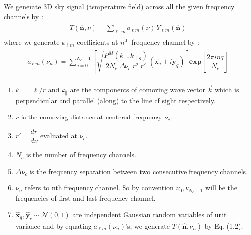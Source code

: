 \documentclass[a4paper,11pt,oneside,english,openany]{sphinxmanual}
\begin{document}
\sphinxAtStartPar
We generate 3D sky signal (temperature field) across all the given frequency channels by :
\begin{equation*}
\begin{split}\begin{align}
\boxed{T(\hat{\mathbf{n}}, \nu) = \sum_{\ell, m} a_{\ell m}(\nu) \, Y_{\ell m}(\hat{\mathbf{n}})}
\end{align}\end{split}
\end{equation*}
\sphinxAtStartPar
where we generate \(a_{\ell m}\) coefficients at \(n^{\text{th}}\) frequency channel by :
\begin{equation*}
\begin{split}\begin{align}
a_{\ell m}(\nu_n) = \sum_{q=0}^{N_c- 1} \left[
\sqrt{\dfrac{P^M(k_\perp, k_{\parallel q})}{2N_c\;\Delta{\nu_c }\;r^2\;r'}}
\left({\hat{\mathbf{x}}_q + i \hat{\mathbf{y}}_q} \right)
\right] {\textbf{exp}}\left[{\dfrac{2\pi i n q}{N_c}}\right]
\end{align}\end{split}
\end{equation*}
\sphinxAtStartPar
{} \sphinxhyphen{}
\begin{enumerate}
%
\item {} 
\sphinxAtStartPar
\(k_{\perp} = \ell/r\) and \(k_{\parallel}\) are the components of comoving wave vector \(\vec{k}\) which is perpendicular and parallel (along) to the line of sight respectively.

\item {} 
\sphinxAtStartPar
\(r\) is the comoving distance at centered frequency \(\nu_c\).

\item {} 
\sphinxAtStartPar
\(r' = \dfrac{dr}{d\nu}\) evaluated at \(\nu_c\).

\item {} 
\sphinxAtStartPar
\(N_c\) is the number of frequency channels.

\item {} 
\sphinxAtStartPar
\(\Delta{\nu_c }\) is the frequency separation between two consecutive frequency channels.

\item {} 
\sphinxAtStartPar
\(\nu_n\) refers to n\sphinxhyphen{}th frequency channel. So by convention \(\nu_0, \nu_{N_c-1}\) will be the frequencies of first and last frequency channel.

\item {} 
\sphinxAtStartPar
\(\hat{\mathbf{x}}_q,\hat{\mathbf{y}}_q \sim \mathcal{N}(0,1)\) are independent Gaussian random variables of unit variance  and by equating \(a_{\ell m}(\nu_n)\)’s, we generate \(T(\hat{\mathbf{n}}, \nu_n)\) by Eq. (1.2).

\end{enumerate}
\end{document}
